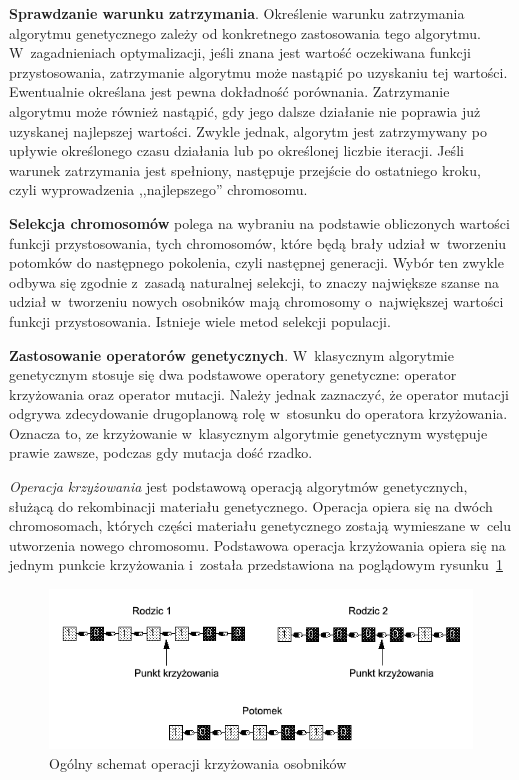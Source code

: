 \documentclass[twoside,12pt]{report}
\begin{document}
\textbf{Sprawdzanie warunku zatrzymania}. Określenie warunku zatrzymania algorytmu genetycznego zależy od konkretnego zastosowania tego algorytmu. W~zagadnieniach optymalizacji, jeśli znana jest wartość oczekiwana funkcji przystosowania, zatrzymanie algorytmu może nastąpić po uzyskaniu tej wartości. Ewentualnie określana jest pewna dokładność porównania. Zatrzymanie algorytmu może również nastąpić, gdy jego dalsze działanie nie poprawia już uzyskanej najlepszej wartości. Zwykle jednak, algorytm jest zatrzymywany po upływie określonego czasu działania lub po określonej liczbie iteracji. Jeśli warunek zatrzymania jest spełniony, następuje przejście do ostatniego kroku, czyli wyprowadzenia ,,najlepszego'' chromosomu.

\textbf{Selekcja chromosomów} polega na wybraniu na podstawie obliczonych wartości funkcji przystosowania, tych chromosomów, które będą brały udział w~tworzeniu potomków do następnego pokolenia, czyli następnej generacji. Wybór ten zwykle odbywa się zgodnie z~zasadą naturalnej selekcji, to znaczy największe szanse na udział w~tworzeniu nowych osobników mają chromosomy o~największej wartości funkcji przystosowania. Istnieje wiele metod selekcji populacji.

\textbf{Zastosowanie operatorów genetycznych}. W~klasycznym algorytmie genetycznym stosuje się dwa podstawowe operatory genetyczne: operator
krzyżowania oraz operator mutacji. Należy jednak zaznaczyć, że operator
mutacji odgrywa zdecydowanie drugoplanową rolę w~stosunku do operatora krzyżowania. Oznacza to, ze krzyżowanie w~klasycznym algorytmie genetycznym występuje prawie zawsze, podczas gdy mutacja dość rzadko. 

\textit{Operacja krzyżowania} jest podstawową operacją algorytmów genetycznych, służącą do rekombinacji materiału genetycznego. Operacja opiera się na dwóch chromosomach, których części materiału genetycznego zostają wymieszane w~celu utworzenia nowego chromosomu. Podstawowa operacja krzyżowania opiera się na jednym punkcie krzyżowania i~została przedstawiona na poglądowym rysunku~\ref{fig:krzyzowanie_schemat}~\cite{genetyczne-dane=ewo}

\begin{figure}[htbp]
	\centering
	\includegraphics[width=\textwidth]{img/crossover}
	\caption{Ogólny schemat operacji krzyżowania osobników}
	\label{fig:krzyzowanie_schemat}
\end{figure}
\end{document}
